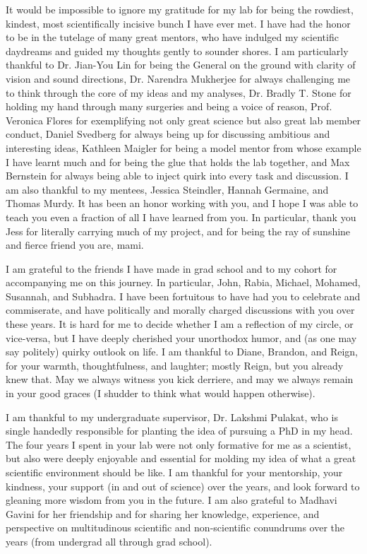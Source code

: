 \documentclass{brandeis-dissertation3.12}
\begin{document}
\begin{doublespace}
It would be impossible to ignore my gratitude for my lab for being the rowdiest, kindest, most scientifically incisive bunch I have ever met. I have had the honor to be in the tutelage of many great mentors, who have indulged my scientific daydreams and guided my thoughts gently to sounder shores. I am particularly thankful to Dr. Jian-You Lin for being the General on the ground with clarity of vision and sound directions, Dr. Narendra Mukherjee for always challenging me to think through the core of my ideas and my analyses, Dr. Bradly T. Stone for holding my hand through many surgeries and being a voice of reason, Prof. Veronica Flores for exemplifying not only great science but also great lab member conduct, Daniel Svedberg for always being up for discussing ambitious and interesting ideas, Kathleen Maigler for being a model mentor from whose example I have learnt much and for being the glue that holds the lab together, and Max Bernstein for always being able to inject quirk into every task and discussion. I am also thankful to my mentees, Jessica Steindler, Hannah Germaine, and Thomas Murdy. It has been an honor working with you, and I hope I was able to teach you even a fraction of all I have learned from you. In particular, thank you Jess for literally carrying much of my project, and for being the ray of sunshine and fierce friend you are, mami.

I am grateful to the friends I have made in grad school and to my cohort for accompanying me on this journey. In particular, John, Rabia, Michael, Mohamed, Susannah, and Subhadra. I have been fortuitous to have had you to celebrate and commiserate, and have politically and morally charged discussions with you over these years. It is hard for me to decide whether I am a reflection of my circle, or vice-versa, but I have deeply cherished your unorthodox humor, and (as one may say politely) quirky outlook on life. I am thankful to Diane, Brandon, and Reign, for your warmth, thoughtfulness, and laughter; mostly Reign, but you already knew that. May we always witness you kick derriere, and may we always remain in your good graces (I shudder to think what would happen otherwise).

I am thankful to my undergraduate supervisor, Dr. Lakshmi Pulakat, who is single handedly responsible for planting the idea of pursuing a PhD in my head. The four years I spent in your lab were not only formative for me as a scientist, but also were deeply enjoyable and essential for molding my idea of what a great scientific environment should be like. I am thankful for your mentorship, your kindness, your support (in and out of science) over the years, and look forward to gleaning more wisdom from you in the future. I am also grateful to Madhavi Gavini for her friendship and for sharing her knowledge, experience, and perspective on multitudinous scientific and non-scientific conundrums over the years (from undergrad all through grad school).


\end{doublespace}
\end{document}
